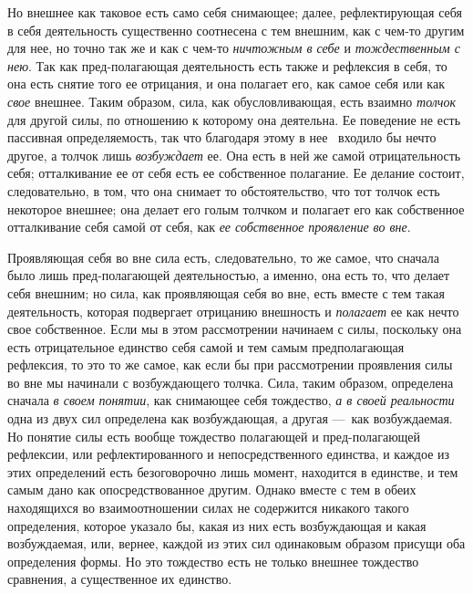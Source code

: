 Но внешнее как таковое есть само себя снимающее; далее, рефлектирующая себя
в себя деятельность существенно соотнесена с тем внешним, как с чем-то
другим для нее, но точно так же и как с чем-то
{\em ничтожным в себе} и
{\em тождественным с нею}. Так как пред-полагающая
деятельность есть также и рефлексия в себя, то она есть снятие того ее
отрицания, и она полагает его, как самое себя или как
{\em свое} внешнее. Таким образом, сила, как
обусловливающая, есть взаимно {\em толчок} для другой
силы, по отношению к которому она деятельна. Ее поведение не есть пассивная
определяемость, так что благодаря этому в нее \ входило бы нечто другое, а
толчок лишь {\em возбуждает} ее. Она есть в ней же
самой отрицательность себя; отталкивание ее от себя есть ее собственное
полагание. Ее делание состоит, следовательно, в том, что она снимает то
обстоятельство, что тот толчок есть некоторое внешнее; она делает его голым
толчком и полагает его как собственное отталкивание себя самой от себя, как
{\em ее собственное проявление во вне}.

Проявляющая себя во вне сила есть, следовательно, то же самое, что сначала
было лишь пред-полагающей деятельностью, а именно, она есть то, что делает
себя внешним; но сила, как проявляющая себя во вне, есть вместе с тем такая
деятельность, которая подвергает отрицанию внешность и
{\em полагает} ее как нечто свое собственное. Если мы в
этом рассмотрении начинаем с силы, поскольку она есть отрицательное
единство себя самой и тем самым предполагающая рефлексия, то это то же
самое, как если бы при рассмотрении проявления силы во вне мы начинали с
возбуждающего толчка. Сила, таким образом, определена сначала
{\em в своем понятии}, как снимающее себя тождество,
{\em а в своей реальности} одна из двух сил определена
как возбуждающая, а другая —~как возбуждаемая. Но понятие силы есть вообще
тождество полагающей и пред-полагающей рефлексии, или рефлектированного и
непосредственного единства, и каждое из этих определений есть безоговорочно
лишь момент, находится в единстве, и тем самым дано как опосредствованное
другим. Однако вместе с тем в обеих находящихся во взаимоотношении силах не
содержится никакого такого определения, которое указало бы, какая из них
есть возбуждающая и какая возбуждаемая, или, вернее, каждой из этих сил
одинаковым образом присущи оба определения формы. Но это тождество есть не
только внешнее тождество сравнения, а существенное их единство.

